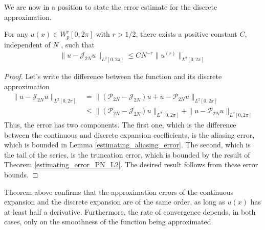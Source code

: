     We are now in a position to state the error estimate for the discrete approximation.
    \begin{teor}
    \label{estimating_error_I_N_L2}	
    For any $u(x) \in W_p^r [0, 2\pi]$ with $r > 1/2$, there exists a positive constant $C$, independent of $N$ , such that
    \begin{align*}
        \| u - \mathcal{J}_{2N}u \|_{L^2 [0, 2\pi]} \leq CN^{-r} \| u^{(r)} \|_{L^2 [0, 2\pi]}
    \end{align*}
	\end{teor}
    \begin{proof}
    Let’s write the difference between the function and its discrete approximation
    \begin{align*}
        \| u - \mathcal{J}_{2N}u \|_{L^2 [0, 2\pi]} &= \| (\mathcal{P}_{2N} - \mathcal{J}_{2N})u + u - \mathcal{P}_{2N}u \|_{L^2 [0, 2\pi] } \\
        &\leq  \| (\mathcal{P}_{2N} - \mathcal{J}_{2N})u \|_{L^2 [0, 2\pi] } + \| u - \mathcal{P}_{2N}u \|_{L^2 [0, 2\pi] }
    \end{align*}
    Thus, the error has two components. The first one, which is the difference between the continuous and discrete expansion coefficients, is the aliasing error, which is bounded in Lemma \ref{estimating_aliasing_error}. The second, which is the tail of the series, is the truncation error, which is bounded by the result of Theorem \ref{estimating_error_PN_L2}. The desired result follows from these error bounds.
	\end{proof}

    Theorem above confirms that the approximation errors of the continuous expansion and the discrete expansion are of the same order, as long as $u(x)$ has at least half a derivative. Furthermore, the rate of convergence depends, in both cases, only on the smoothness of the function being approximated.   